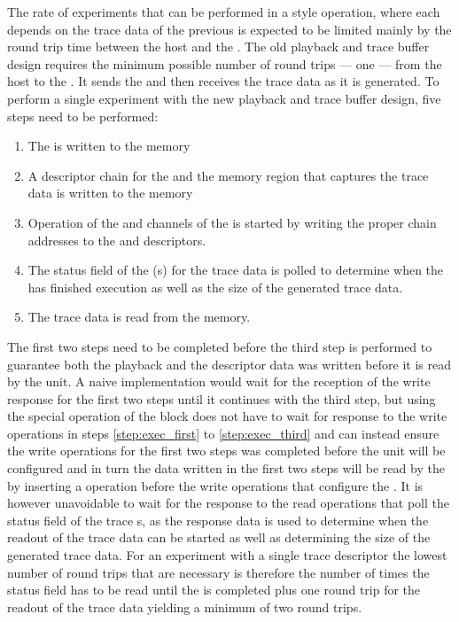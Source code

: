 The rate of experiments that can be performed in a \HWinTheLoop{} style operation, where each \PlaybackProgram{} depends on the trace data of the previous \PlaybackProgram{} is expected to be limited mainly by the round trip time between the host and the \FPGA{}. The old playback and trace buffer design requires the minimum possible number of round trips --- one --- from the host to the \FPGA{}. It sends the \PlaybackProgram{} and then receives the trace data as it is generated.
To perform a single experiment with the new playback and trace buffer design, five steps need to be performed:
\begin{enumerate}
    \item\label{step:exec_first} The \PlaybackProgram{} is written to the \DDR{} memory
    \item A descriptor{} chain for the \PlaybackProgram{} and the memory region that captures the trace data is written to the \descriptor{} memory
    \item\label{step:exec_third} Operation of the \SToMM{} and \MMToS{} channels of the \AXIDMA{} is started by writing the proper \descriptor{} chain addresses to the \curdesc{} and \taildesc{} descriptors.
    \item The status field of the \descriptor{}(s) for the trace data is polled to determine when the \PlaybackProgram{} has finished execution as well as the size of the generated trace data.
    \item The trace data is read from the \DDR{} memory.
\end{enumerate}
The first two steps need to be completed before the third step is performed to guarantee both the playback and the descriptor data was written before it is read by the \AXIDMA{} unit.
A naive implementation would wait for the reception of the write response for the first two steps until it continues with the third step, but using the special \globalfence{} operation of the \FAXI{} block \ayo{} does not have to wait for response to the write operations in steps \autoref{step:exec_first} to \autoref{step:exec_third} and can instead ensure the write operations for the first two steps was completed before the \AXIDMA{} unit will be configured and in turn the data written in the first two steps will be read by the \AXIDMA{} by inserting a \globalfence{} operation before the write operations that configure the \AXIDMA{}. It is however unavoidable to wait for the response to the read operations that poll the status field of the trace \descriptor{}s, as the response data is used to determine when the readout of the trace data can be started as well as determining the size of the generated trace data. For an experiment with a single trace descriptor the lowest number of round trips that are necessary is therefore the number of times the status field has to be read until the \PlaybackProgram{} is completed plus one round trip for the readout of the trace data yielding a minimum of two round trips.
